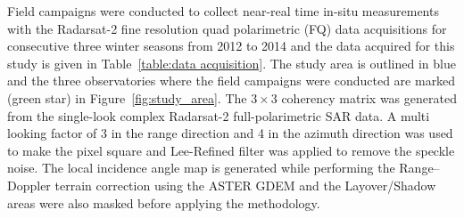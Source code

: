 Field campaigns were conducted to collect near-real time in-situ measurements with the Radarsat-2 fine resolution quad polarimetric (FQ) data acquisitions for consecutive three winter seasons from 2012 to 2014 and the data acquired for this study is given in Table~\ref{table:data acquisition}. The study area is outlined in blue and the three observatories where the field campaigns were conducted are marked (green star) in Figure~\ref{fig:study_area}. The $3\times3$ coherency matrix was generated from the single-look complex Radarsat-2 full-polarimetric SAR data. A multi looking factor of 3 in the range direction and 4 in the azimuth direction was used to make the pixel square and Lee-Refined filter was applied to remove the speckle noise. The local incidence angle map is generated while performing the Range–Doppler terrain correction using the ASTER GDEM and the Layover/Shadow areas were also masked before applying the methodology. 
